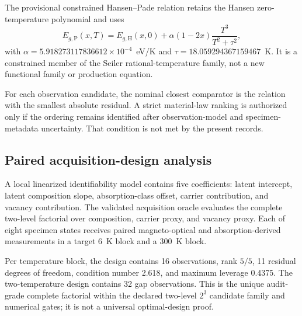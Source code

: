The provisional constrained Hansen--Pade relation retains the Hansen zero-temperature polynomial and uses
\begin{equation}
  E_{g,\mathrm{P}}(x,T) = E_{g,\mathrm{H}}(x,0)
  + \alpha(1-2x)\frac{T^3}{T^2+\tau^2},
  \label{eq:provisional}
\end{equation}
with $\alpha=5.918273117836612\times10^{-4}$~eV/K and $\tau=18.059294367159467$~K. It is a constrained member of the Seiler rational-temperature family, not a new functional family or production equation.

For each observation candidate, the nominal closest comparator is the relation with the smallest absolute residual. A strict material-law ranking is authorized only if the ordering remains identified after observation-model and specimen-metadata uncertainty. That condition is not met by the present records.

\subsection{Paired acquisition-design analysis}
\label{sec:design}

A local linearized identifiability model contains five coefficients: latent intercept, latent composition slope, absorption-class offset, carrier contribution, and vacancy contribution. The validated acquisition oracle evaluates the complete two-level factorial over composition, carrier proxy, and vacancy proxy. Each of eight specimen states receives paired magneto-optical and absorption-derived measurements in a target 6~K block and a 300~K block.

Per temperature block, the design contains 16 observations, rank $5/5$, 11 residual degrees of freedom, condition number 2.618, and maximum leverage 0.4375. The two-temperature design contains 32 gap observations. This is the unique audit-grade complete factorial within the declared two-level $2^3$ candidate family and numerical gates; it is not a universal optimal-design proof.